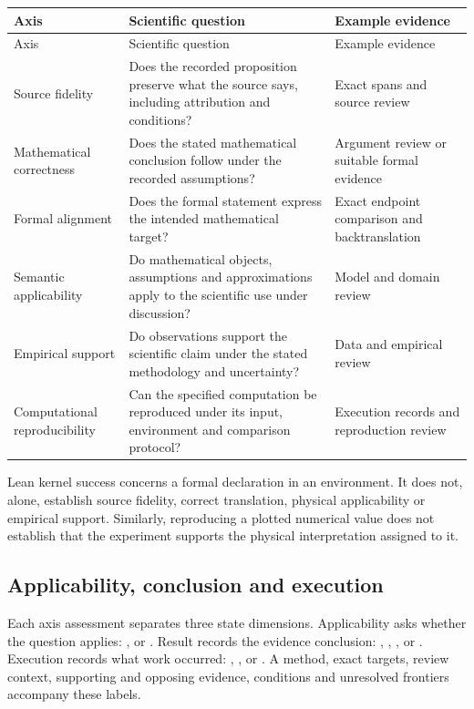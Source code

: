 \begin{longtable}{@{}P{37mm}P{58mm}P{24mm}@{}}
\toprule
Axis & Scientific question & Example evidence \\
\midrule\endfirsthead
\toprule Axis & Scientific question & Example evidence \\
\midrule\endhead
Source fidelity & Does the recorded proposition preserve what the source says, including attribution and conditions? & Exact spans and source review \\
Mathematical correctness & Does the stated mathematical conclusion follow under the recorded assumptions? & Argument review or suitable formal evidence \\
Formal alignment & Does the formal statement express the intended mathematical target? & Exact endpoint comparison and backtranslation \\
Semantic applicability & Do mathematical objects, assumptions and approximations apply to the scientific use under discussion? & Model and domain review \\
Empirical support & Do observations support the scientific claim under the stated methodology and uncertainty? & Data and empirical review \\
Computational reproducibility & Can the specified computation be reproduced under its input, environment and comparison protocol? & Execution records and reproduction review \\
\bottomrule
\end{longtable}

 Lean kernel success concerns a formal declaration in an environment. It does not, alone, establish source fidelity, correct translation, physical applicability or empirical support. Similarly, reproducing a plotted numerical value does not establish that the experiment supports the physical interpretation assigned to it.

\subsection{Applicability, conclusion and execution}

Each axis assessment separates three state dimensions. Applicability asks whether the question applies: ,  or . Result records the evidence conclusion: , , ,  or . Execution records what work occurred: , ,  or . A method, exact targets, review context, supporting and opposing evidence, conditions and unresolved frontiers accompany these labels.

